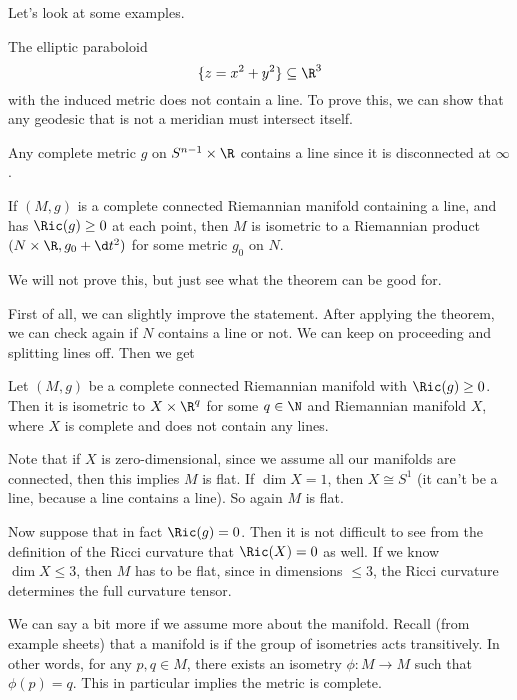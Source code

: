 \documentclass[a4paper]{article}
\begin{document}
Let's look at some examples.
\begin{eg}
  The elliptic paraboloid
  \[
    \{z = x^2 + y^2\} \subseteq \R^3
  \]
  with the induced metric does not contain a line. To prove this, we can show that any geodesic that is not a meridian must intersect itself.
\end{eg}

\begin{eg}
  Any complete metric $g$ on $S^{n - 1} \times \R$ contains a line since it is disconnected at $\infty$.
\end{eg}

\begin{thm}
  If $(M, g)$ is a complete connected Riemannian manifold containing a line, and has $\Ric(g) \geq 0$ at each point, then $M$ is isometric to a Riemannian product $(N \times \R, g_0 + \d t^2)$ for some metric $g_0$ on $N$.
\end{thm}
We will not prove this, but just see what the theorem can be good for.

First of all, we can slightly improve the statement. After applying the theorem, we can check again if $N$ contains a line or not. We can keep on proceeding and splitting lines off. Then we get
\begin{cor}
  Let $(M, g)$ be a complete connected Riemannian manifold with $\Ric(g) \geq 0$. Then it is isometric to $X \times \R^q$ for some $q \in \N$ and Riemannian manifold $X$, where $X$ is complete and does not contain any lines.
\end{cor}

Note that if $X$ is zero-dimensional, since we assume all our manifolds are connected, then this implies $M$ is flat. If $\dim X = 1$, then $X \cong S^1$ (it can't be a line, because a line contains a line). So again $M$ is flat.

Now suppose that in fact $\Ric(g) = 0$. Then it is not difficult to see from the definition of the Ricci curvature that $\Ric(X) = 0$ as well. If we know $\dim X \leq 3$, then $M$ has to be flat, since in dimensions $\leq 3$, the Ricci curvature determines the full curvature tensor.

We can say a bit more if we assume more about the manifold.  Recall (from example sheets) that a manifold is  if the group of isometries acts transitively. In other words, for any $p, q \in M$, there exists an isometry $\phi: M \to M$ such that $\phi(p) = q$. This in particular implies the metric is complete.
\end{document}
